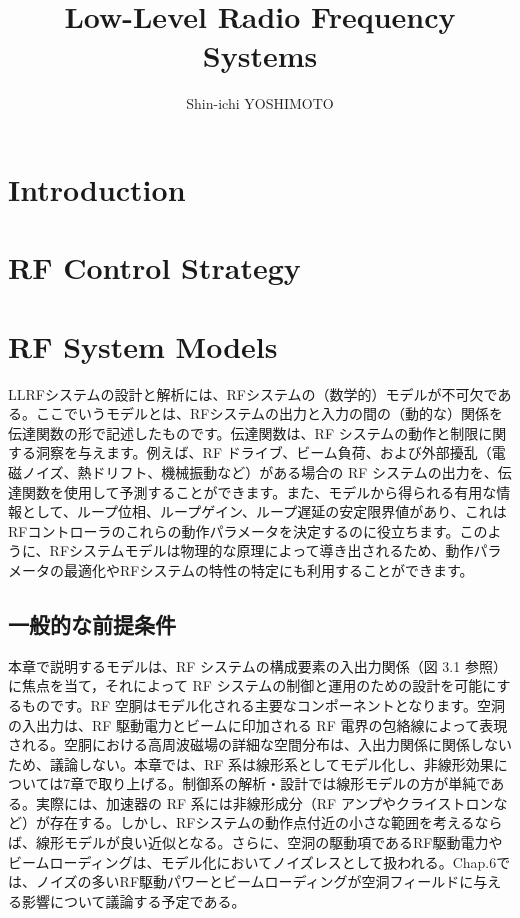 \documentclass[book]{jlreq}
\begin{document}
\title{Low-Level Radio Frequency Systems}
\author{Shin-ichi YOSHIMOTO}
\maketitle
\tableofcontents

\chapter{Introduction}

\chapter{RF Control Strategy}
\chapter{RF System Models}

LLRFシステムの設計と解析には、RFシステムの（数学的）モデルが不可欠である。ここでいうモデルとは、RFシステムの出力と入力の間の（動的な）関係を伝達関数の形で記述したものです。伝達関数は、RF システムの動作と制限に関する洞察を与えます。例えば、RF ドライブ、ビーム負荷、および外部擾乱（電磁ノイズ、熱ドリフト、機械振動など）がある場合の RF システムの出力を、伝達関数を使用して予測することができます。また、モデルから得られる有用な情報として、ループ位相、ループゲイン、ループ遅延の安定限界値があり、これはRFコントローラのこれらの動作パラメータを決定するのに役立ちます。このように、RFシステムモデルは物理的な原理によって導き出されるため、動作パラメータの最適化やRFシステムの特性の特定にも利用することができます。

\section{一般的な前提条件}

本章で説明するモデルは、RF システムの構成要素の入出力関係（図 3.1 参照）に焦点を当て，それによって RF システムの制御と運用のための設計を可能にするものです。RF 空胴はモデル化される主要なコンポーネントとなります。空洞の入出力は、RF 駆動電力とビームに印加される RF 電界の包絡線によって表現される。空胴における高周波磁場の詳細な空間分布は、入出力関係に関係しないため、議論しない。本章では、RF 系は線形系としてモデル化し、非線形効果については7章で取り上げる。制御系の解析・設計では線形モデルの方が単純である。実際には、加速器の RF 系には非線形成分（RF アンプやクライストロンなど）が存在する。しかし、RFシステムの動作点付近の小さな範囲を考えるならば、線形モデルが良い近似となる。さらに、空洞の駆動項であるRF駆動電力やビームローディングは、モデル化においてノイズレスとして扱われる。Chap.6では、ノイズの多いRF駆動パワーとビームローディングが空洞フィールドに与える影響について議論する予定である。
\end{document}
